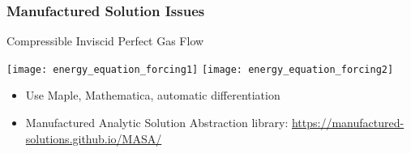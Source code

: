 \begin{frame}
\frametitle{Manufactured Solution Issues}
\begin{block}{Compressible Inviscid Perfect Gas Flow}

\texttt{[image: energy\_equation\_forcing1]}
\texttt{[image: energy\_equation\_forcing2]}

\end{block}

\begin{itemize}
\item Use Maple, Mathematica, automatic differentiation
\item Manufactured Analytic Solution Abstraction library:
      \url{https://manufactured-solutions.github.io/MASA/}
\end{itemize}

\end{frame}

